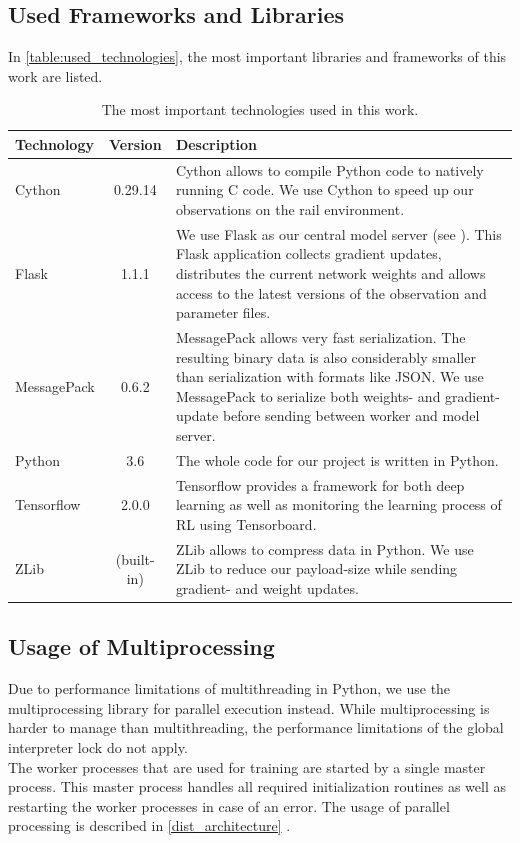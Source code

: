 \subsection*{Used Frameworks and Libraries}\label{framework_and_libraries}
In \autoref{table:used_technologies}, the most important libraries and frameworks of this work are listed.
\begin{table}[H]
	\centering
	\begin{tabularx}{\textwidth}{ |l|c|X| }
		\hline
		\textbf{Technology}	& \textbf{Version} & \textbf{Description}\\
		\hline
		Cython & 0.29.14 & Cython allows to compile Python code to natively running C code. We use Cython to speed up our observations on the rail environment.\\
		\hline
		Flask & 1.1.1 & We use Flask as our central model server (see \nameref{dist_architecture}). This Flask application collects gradient updates, distributes the current network weights and allows access to the latest versions of the observation and parameter files.\\
		\hline
		MessagePack & 0.6.2 & MessagePack allows very fast serialization. The resulting binary data is also considerably smaller than serialization with formats like JSON. We use MessagePack to serialize both weights- and gradient-update before sending between worker and model server.\\
		\hline
		Python & 3.6 & The whole code for our project is written in Python.\\
		\hline
		Tensorflow & 2.0.0 & Tensorflow provides a framework for both deep learning as well as monitoring the learning process of RL using Tensorboard.\\
		\hline
		ZLib & (built-in) & ZLib allows to compress data in Python. We use ZLib to reduce our payload-size while sending gradient- and weight updates.\\
		\hline
	\end{tabularx}
	\caption{The most important technologies used in this work.}
	\label{table:used_technologies}
\end{table}
\subsection*{Usage of Multiprocessing}\label{multiprocessing}
Due to performance limitations of multithreading in Python, we use the multiprocessing library for parallel execution instead. While multiprocessing is harder to manage than multithreading, the performance limitations of the global interpreter lock \cite{python_gil} do not apply.\\
The worker processes that are used for training are started by a single master process. This master process handles all required initialization routines as well as restarting the worker processes in case of an error. The usage of parallel processing is described in \ref{dist_architecture} .

